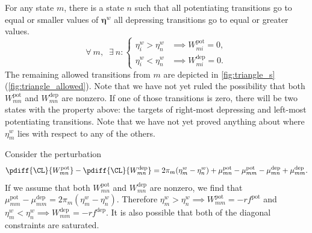 \documentclass[12pt]{article}
\newcommand{\eqm}{\pi}
\newcommand{\etwm}{\eta^w}
\newcommand{\etw}{\boldsymbol{\eta}^w}
\newcommand{\Wm}{W}
\newcommand{\pot}{^{\text{pot}}}
\newcommand{\dep}{^{\text{dep}}}
\begin{document}
For any state \(m\), there is a state \(n\) such that all potentiating transitions go to equal or smaller values of \(\etw\) all depressing transitions go to equal or greater values.
%
\begin{equation}\label{eq:separator}
  \forall\ m, \;\; \exists\ n : 
  \begin{cases}
    \etwm_i > \etwm_n &\implies \Wm\pot_{mi} = 0, \\
    \etwm_i < \etwm_n &\implies \Wm\dep_{mi} = 0.
  \end{cases}
\end{equation}
%
The remaining allowed transitions from \(m\) are depicted in \cref{fig:triangle_s}(\ref{fig:triangle_allowed}).
Note that we have not yet ruled the possibility that both \( \Wm\pot_{mn} \) and \( \Wm\dep_{mn} \) are nonzero.
If one of those transitions is zero, there will be two states with the property above: the targets of right-most depressing and left-most potentiating transitions.
Note that we have not yet proved anything about where \(\etwm_m\) lies with respect to any of the others.

Consider the perturbation
%
\begin{equation}\label{eq:pertK}
  \pdiff{\CL}{\Wm\pot_{mn}} -
  \pdiff{\CL}{\Wm\dep_{mn}} =
    2 \eqm_m (\etwm_m - \etwm_n) 
    + \mu\pot_{mn} - \mu\pot_{mm} - \mu\dep_{mn} + \mu\dep_{mm}.
\end{equation}
%
If we assume that both \( \Wm\pot_{mn} \) and \( \Wm\dep_{mn} \) are nonzero, we find that \( \mu\pot_{mm} - \mu\dep_{mm} = 2 \eqm_m (\etwm_m - \etwm_n) \).
Therefore \( \etwm_m > \etwm_n \implies \Wm\pot_{mm} = -rf\pot \) and \( \etwm_m < \etwm_n \implies \Wm\dep_{mm} = -rf\dep \).
It is also possible that both of the diagonal constraints are saturated.
\end{document}
